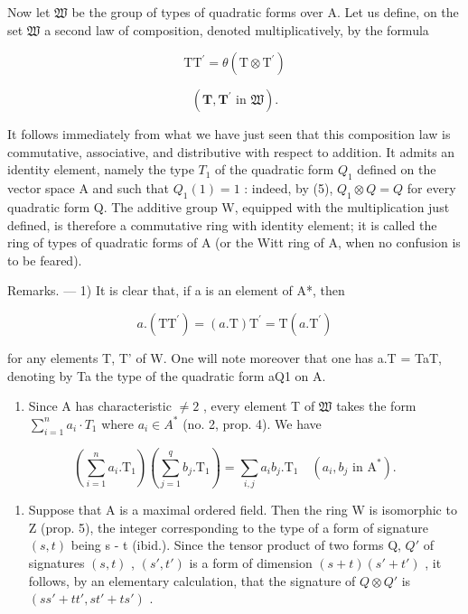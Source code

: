 Now let \(\mathfrak{W}\) be the group of types of quadratic forms over A. Let us define, on the set \(\mathfrak{W}\) a second law of composition, denoted multiplicatively, by the formula

\[
\mathrm{TT} ^ {\prime} = \theta (\mathrm{T} \otimes \mathrm{T} ^ {\prime})\tag{6}
\]

\[
(\mathbf {T}, \mathbf {T} ^ {\prime} \text {   in   } \mathfrak {W}).
\]

It follows immediately from what we have just seen that this composition law is commutative, associative, and distributive with respect to addition. It admits an identity element, namely the type \(T_{1}\) of the quadratic form \(Q_{1}\) defined on the vector space A and such that \(Q_{1}(1)=1\) : indeed, by (5), \(Q_{1}\otimes Q=Q\) for every quadratic form Q. The additive group W, equipped with the multiplication just defined, is therefore a commutative ring with identity element; it is called the ring of types of quadratic forms of A (or the Witt ring of A, when no confusion is to be feared).

Remarks. --- 1) It is clear that, if a is an element of A*, then

\[
a. (\mathrm{TT} ^ {\prime}) = (a. \mathrm{T}) \mathrm{T} ^ {\prime} = \mathrm{T} (a. \mathrm{T} ^ {\prime})\tag{7}
\]

for any elements T, T' of W. One will note moreover that one has a.T = TaT, denoting by Ta the type of the quadratic form aQ1 on A.

\begin{enumerate}
\def\labelenumi{\arabic{enumi})}
\setcounter{enumi}{1}
\tightlist
\item
  Since A has characteristic \(\neq 2\) , every element T of \(\mathfrak{W}\) takes the form \(\sum_{i=1}^{n} a_i \cdot T_1\) where \(a_i \in A^*\) (no. 2, prop. 4). We have
\end{enumerate}

\[
(\sum_ {i = 1} ^ {n} a _ {i}. \mathrm{T} _ {1}) (\sum_ {j = 1} ^ {q} b _ {j}. \mathrm{T} _ {1}) = \sum_ {i, j} a _ {i} b _ {j}. \mathrm{T} _ {1} \quad (a _ {i}, b _ {j} \text {   in   } \mathrm{A} ^ {*}).\tag{8}
\]

\begin{enumerate}
\def\labelenumi{\arabic{enumi})}
\setcounter{enumi}{2}
\tightlist
\item
  Suppose that A is a maximal ordered field. Then the ring W is isomorphic to Z (prop. 5), the integer corresponding to the type of a form of signature \((s, t)\) being s - t (ibid.). Since the tensor product of two forms Q, \(Q'\) of signatures \((s, t)\) , \((s', t')\) is a form of dimension \((s + t)(s' + t')\) , it follows, by an elementary calculation, that the signature of \(Q \otimes Q'\) is \((ss' + tt', st' + ts')\) .
\end{enumerate}

